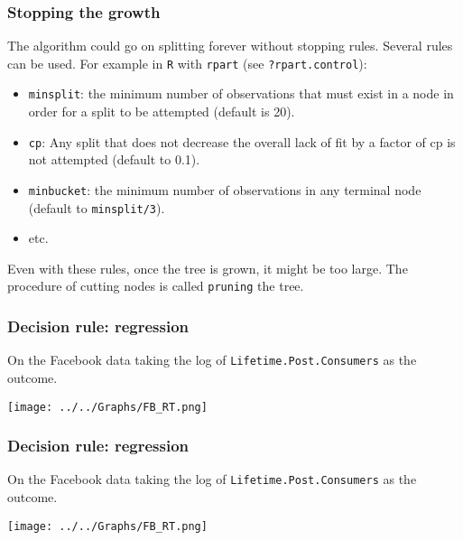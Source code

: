 \begin{frame}
\frametitle{Stopping the growth}
The algorithm could go on splitting forever without stopping rules. Several rules can be used. For example in {\tt R} with {\tt rpart} (see {\tt ?rpart.control}):
\begin{itemize}
\item {\tt minsplit}: the minimum number of observations that must exist in a node in order for a split to be attempted (default is 20).
\item {\tt cp}: Any split that does not decrease the overall lack of fit by a factor of cp is not attempted (default to 0.1).
\item {\tt minbucket}: the minimum number of observations in any terminal node (default to {\tt minsplit/3}).  
\item etc.
\end{itemize}
Even with these rules, once the tree is grown, it might be too large. The procedure of cutting nodes is called {\tt pruning} the tree.  
\end{frame}
\begin{frame}
\frametitle{Decision rule: regression}
On the Facebook data taking the log of {\tt Lifetime.Post.Consumers} as the outcome.
\begin{center}
\texttt{[image: ../../Graphs/FB\_RT.png]}
\end{center}
\end{frame}
\begin{frame}
\frametitle{Decision rule: regression}
On the Facebook data taking the log of {\tt Lifetime.Post.Consumers} as the outcome.
\begin{center}
\texttt{[image: ../../Graphs/FB\_RT.png]}
\end{center}
\end{frame}
